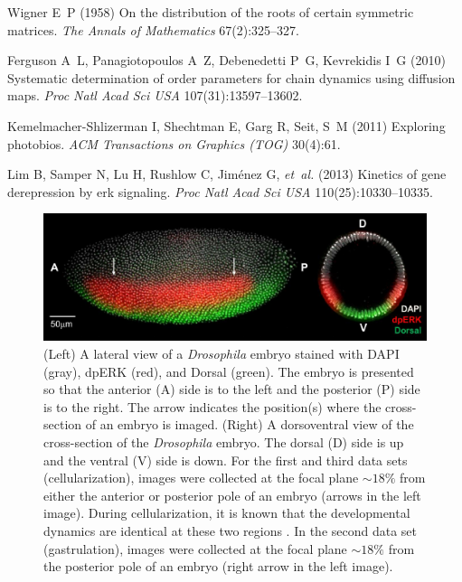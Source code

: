 \documentclass{pnastwo}
\begin{document}
\begin{article}
\begin{thebibliography}{10}
Wigner E~P (1958) On the distribution of the roots of certain symmetric
  matrices. \textit{The Annals of Mathematics} 67(2):325--327.

Ferguson A~L, Panagiotopoulos A~Z, Debenedetti P~G, Kevrekidis I~G (2010)
  Systematic determination of order parameters for chain dynamics using
  diffusion maps. \textit{Proc Natl Acad Sci USA}
  107(31):13597--13602.

Kemelmacher-Shlizerman I, Shechtman E, Garg R, Seit, S~M (2011)
Exploring photobios. \textit{ACM Transactions on Graphics (TOG)} 30(4):61.

Lim B, Samper N, Lu H, Rushlow C, Jim{\'e}nez G, \textit{et~al.} (2013)
  Kinetics of gene derepression by erk signaling. \textit{Proc Natl Acad Sci USA} 110(25):10330--10335.

\end{thebibliography}


\end{article}

\begin{figure}
\includegraphics{figS1}
\caption{(Left) A lateral view of a {\it Drosophila} embryo stained with DAPI (gray), dpERK (red), and Dorsal (green). The embryo is presented so that the anterior (A) side is to the left and the posterior (P) side is to the right. The arrow indicates the position(s) where the cross-section of an embryo is imaged. (Right) A dorsoventral view of the cross-section of the {\it Drosophila} embryo. The dorsal (D) side is up and the ventral (V) side is down. For the first and third data sets (cellularization), images were collected at the focal plane $\sim 18\%$ from either the anterior or posterior pole of an embryo (arrows in the left image). During cellularization, it is known that the developmental dynamics are identical at these two regions \cite{lim2013kinetics}. In the second data set (gastrulation), images were collected at the focal plane $\sim 18\%$ from the posterior pole of an embryo (right arrow in the left image). }
\label{fig:ap_dv}
\end{figure}
\end{document}

